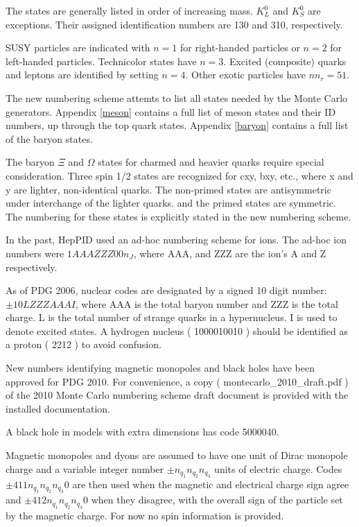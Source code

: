 The states are generally listed in order of increasing mass.  
$K_L^0$ and $K_S^0$ are exceptions.  Their assigned
identification numbers are 130 and 310, respectively.

SUSY particles are indicated with $n=1$ for right-handed particles or $n=2$
for left-handed particles.  Technicolor states have $n=3$.
Excited (composite) quarks and leptons are identified by setting $n=4$.
Other exotic particles have $n n_r=51$.

The new numbering scheme attemts to list all states needed by the
Monte Carlo generators.  Appendix \ref{meson}
contains a full list of meson states and their ID numbers, up through the
top quark states.   
Appendix \ref{baryon} contains a full list of the baryon states.

The baryon $\Xi$ and $\Omega$ states for charmed
and heavier quarks require special consideration.  
Three spin 1/2 states are recognized
for cxy, bxy, etc., where x and y are lighter, non-identical quarks.
The non-primed states are antisymmetric under interchange of the lighter quarks.
and the primed states are symmetric.  The numbering for these states is 
explicitly stated in the new numbering scheme.

In the past, HepPID used an ad-hoc numbering scheme for ions.  
The ad-hoc ion numbers were $1AAAZZZ00n_J$, where
AAA, and ZZZ are the ion's A and Z respectively.

As of PDG 2006\cite{scheme}, nuclear codes are designated by a 
signed 10 digit number: $\pm 10LZZZAAAI$, where 
AAA is the total baryon number and
ZZZ is the total charge.
L is the total number of strange quarks in a hypernucleus.  
I is used to denote excited states.
A hydrogen nucleus ( 1000010010 ) should be identified as a proton ( 2212 )
to avoid confusion.

New numbers identifying magnetic monopoles and black holes have been 
approved for PDG 2010.  For convenience, a copy ( montecarlo\_2010\_draft.pdf ) 
of the 2010 Monte Carlo numbering scheme draft document is 
provided with the installed documentation.

A black hole in models with extra dimensions has code 5000040.  

Magnetic monopoles and dyons are assumed to have one
unit of Dirac monopole charge and a variable integer number
$\pm n_{q_1}n_{q_2}n_{q_3}$ units of electric charge. 
Codes $\pm 411n_{q_1}n_{q_2}n_{q_3}0$ are then used when the magnetic and 
electrical charge sign agree and $\pm 412n_{q_1}n_{q_2}n_{q_3}0$  
when they disagree, with the overall sign of the particle set by the 
magnetic charge.  For now no spin information is provided.

